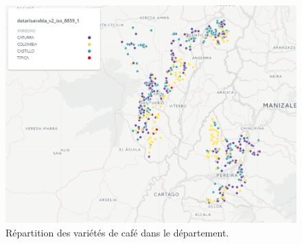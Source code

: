 \begin{figure}
	\centering
	\includegraphics[width=0.7\linewidth]{img/Exploration/VariedadMap}
	\caption{Répartition des variétés de café dans le département.}
	\label{fig:variedadmap}
\end{figure}



